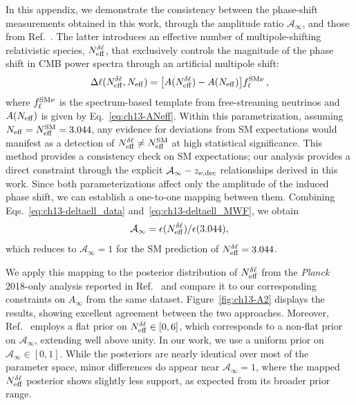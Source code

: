 \begin{subappendices}
\noindent In this appendix, we demonstrate the consistency between the phase-shift measurements obtained in this work, through the amplitude ratio $\mathcal{A}_\infty$, and those from Ref.~\cite{Montefalcone:2025unv}. The latter introduces an effective number of multipole-shifting relativistic species, $N_{\rm eff}^{\delta\ell}$, that exclusively controls the magnitude of the phase shift in CMB power spectra through an artificial multipole shift:
\begin{equation}
	\Delta\ell(N_{\rm eff}^{\delta\ell}, N_\mathrm{eff}) = \bigl[A(N_{\rm eff}^{\delta\ell}) - A(N_\mathrm{eff})\bigr] f^{\rm SM\nu}_\ell\,,	\label{eq:ch13-deltaell_MWF}
\end{equation}
where $f_\ell^{\rm SM\nu}$ is the spectrum-based template from free-streaming neutrinos and $A(N_{\rm eff})$ is given by Eq.~\eqref{eq:ch13-ANeff}. Within this parametrization, assuming $N_{\rm eff}=N_{\rm eff}^{\rm SM}=3.044$, any evidence for deviations from SM expectations would manifest as a detection of $N_{\rm eff}^{\delta\ell} \neq N_{\rm eff}^{\rm SM}$ at high statistical significance. This method provides a consistency check on SM expectations; our analysis provides a direct constraint through the explicit $\mathcal{A}_\infty - z_{\nu,\rm dec}$ relationships derived in this work. Since both parameterizations affect only the amplitude of the induced phase shift, we can establish a one-to-one mapping between them. Combining Eqs.~\eqref{eq:ch13-deltaell_data} and~\eqref{eq:ch13-deltaell_MWF}, we obtain
\begin{equation}
    \mathcal{A}_\infty=\epsilon(N_{\rm eff}^{\delta\ell})/\epsilon(3.044), \label{eq:ch13-Ainfty_to_Ndphi}
\end{equation}
which reduces to $\mathcal{A}_\infty = 1$ for the SM prediction of $N_{\rm eff}^{\delta\ell} = 3.044$.

We apply this mapping to the posterior distribution of $N_{\rm eff}^{\delta\ell}$ from the {\it Planck} 2018-only analysis reported in Ref.~\cite{Montefalcone:2025unv} and compare it to our corresponding constraints on ${A}_\infty$ from the same dataset. Figure~\ref{fig:ch13-A2} displays the results, showing excellent agreement between the two approaches. Moreover, Ref.~\cite{Montefalcone:2025unv} employs a flat prior on $N_{\rm eff}^{\delta\ell} \in [0,6]$, which corresponds to a non-flat prior on $\mathcal{A}_\infty$, extending well above unity. In our work, we use a uniform prior on $\mathcal{A}_\infty \in [0,1]$. While the posteriors are nearly identical over most of the parameter space, minor differences do appear near $\mathcal{A}_\infty = 1$, where the mapped $N_{\rm eff}^{\delta\ell}$ posterior shows slightly less support, as expected from its broader prior range.


\end{subappendices}
